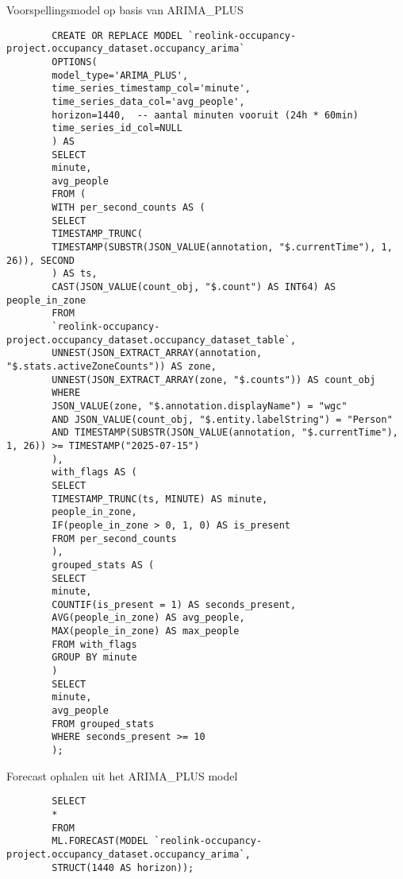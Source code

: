 \documentclass[dutch,dit,thesis]{hogentreport}
\begin{document}
\begin{listing}[H]
    \caption{Voorspellingsmodel op basis van ARIMA\_PLUS}
    \label{lst:people_forecast_model}
    \begin{verbatim}
        CREATE OR REPLACE MODEL `reolink-occupancy-project.occupancy_dataset.occupancy_arima`
        OPTIONS(
        model_type='ARIMA_PLUS',
        time_series_timestamp_col='minute',
        time_series_data_col='avg_people',
        horizon=1440,  -- aantal minuten vooruit (24h * 60min)
        time_series_id_col=NULL
        ) AS
        SELECT
        minute,
        avg_people
        FROM (
        WITH per_second_counts AS (
        SELECT
        TIMESTAMP_TRUNC(
        TIMESTAMP(SUBSTR(JSON_VALUE(annotation, "$.currentTime"), 1, 26)), SECOND
        ) AS ts,
        CAST(JSON_VALUE(count_obj, "$.count") AS INT64) AS people_in_zone
        FROM
        `reolink-occupancy-project.occupancy_dataset.occupancy_dataset_table`,
        UNNEST(JSON_EXTRACT_ARRAY(annotation, "$.stats.activeZoneCounts")) AS zone,
        UNNEST(JSON_EXTRACT_ARRAY(zone, "$.counts")) AS count_obj
        WHERE
        JSON_VALUE(zone, "$.annotation.displayName") = "wgc"
        AND JSON_VALUE(count_obj, "$.entity.labelString") = "Person"
        AND TIMESTAMP(SUBSTR(JSON_VALUE(annotation, "$.currentTime"), 1, 26)) >= TIMESTAMP("2025-07-15")
        ),
        with_flags AS (
        SELECT
        TIMESTAMP_TRUNC(ts, MINUTE) AS minute,
        people_in_zone,
        IF(people_in_zone > 0, 1, 0) AS is_present
        FROM per_second_counts
        ),
        grouped_stats AS (
        SELECT
        minute,
        COUNTIF(is_present = 1) AS seconds_present,
        AVG(people_in_zone) AS avg_people,
        MAX(people_in_zone) AS max_people
        FROM with_flags
        GROUP BY minute
        )
        SELECT
        minute,
        avg_people
        FROM grouped_stats
        WHERE seconds_present >= 10
        );
    \end{verbatim}
\end{listing}

\begin{listing}[H]
    \caption{Forecast ophalen uit het ARIMA\_PLUS model}
    \label{lst:people_forecast_query}
    \begin{verbatim}
        SELECT
        *
        FROM
        ML.FORECAST(MODEL `reolink-occupancy-project.occupancy_dataset.occupancy_arima`,
        STRUCT(1440 AS horizon));
    \end{verbatim}
\end{listing}
\end{document}

